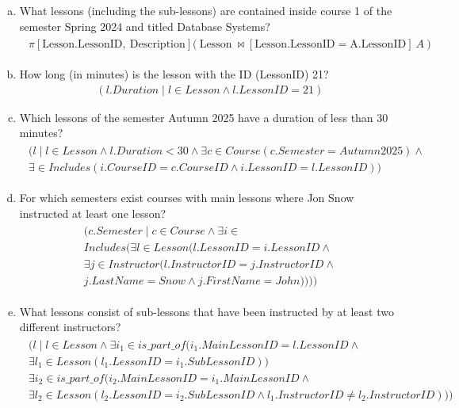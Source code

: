 \documentclass{article}
\begin{document}
\begin{enumerate}[(a)]
\item 
What lessons (including the sub-lessons) are contained inside course 1 of the semester Spring 2024 and titled Database Systems?
\begin{align}
    \begin{split}
\pi\left[\text{Lesson.LessonID},\ \text{Description}\right]
\Big(\ \text{Lesson}\ \Join
\left[\text{Lesson.LessonID}=\text{A.LessonID}\right]\ A\ \Big)
    \end{split}
\end{align}


\item How long (in minutes) is the lesson with the ID (LessonID) 21?
\begin{align}
    (l.Duration \mid l \in Lesson \wedge l.LessonID = 21)
\end{align}

\item Which lessons of the semester Autumn 2025 have a duration of less than 30 minutes?
\begin{align}
    \begin{split}
   (l \mid l \in Lesson \wedge l.Duration < 30 \wedge \exists c \in Course (c.Semester = Autumn 2025)\wedge \\ 
   \exists\in Includes(i.CourseID=c.CourseID\wedge i.LessonID = l.LessonID))
    \end{split}
\end{align}

\item For which semesters exist courses with main lessons where Jon Snow instructed at least one lesson?
\begin{align}
    \begin{split}
   (c.Semester \mid c \in Course\wedge\exists i \in \\
   Includes(\exists l \in Lesson(l.LessonID = i.LessonID \wedge \\
   \exists j \in Instructor (l.InstructorID = j.InstructorID \wedge \\ 
   j.LastName=Snow \wedge j.FirstName = John))))
    \end{split}
\end{align}

\item What lessons consist of sub-lessons that have been instructed by at least two different instructors?
\begin{align}
    \begin{split}
   (l \mid l \in Lesson \wedge \exists i_1 \in is\_part\_of (i_1.MainLessonID=l.LessonID\wedge \\
   \exists l_1 \in Lesson(l_1.LessonID=i_1.SubLessonID))\\
   \exists i_2 \in is\_part\_of (i_2.MainLessonID=i_1.MainLessonID\wedge \\
   \exists l_2 \in Lesson(l_2.LessonID=i_2.SubLessonID\wedge l_1.InstructorID \neq l_2.InstructorID)))
    \end{split}
\end{align}


\end{enumerate}
\end{document}
